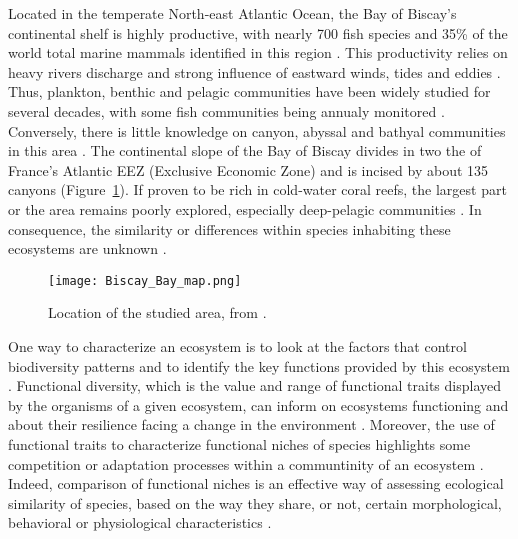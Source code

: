 Located in the temperate North-east Atlantic Ocean, the Bay of Biscay's continental shelf is highly productive, with nearly 700 fish species and 35\% of the world total marine mammals identified in this region \citep{borja2019}. This productivity relies on heavy rivers discharge and strong influence of eastward winds, tides and eddies \citep{borja2019,akpinar2020}. Thus, plankton, benthic and pelagic communities have been widely studied for several decades, with some fish communities being annualy monitored \citep{borja2019,doray2018}. Conversely, there is little knowledge on canyon, abyssal and bathyal communities in this area \citep{borja2019}. The continental slope of the Bay of Biscay divides in two the of France's Atlantic EEZ (Exclusive Economic Zone) and is incised by about 135 canyons \citep{bourillet2006,spitz2019,vandenbeld2017} (Figure~\ref{fig:bbm}). If proven to be rich in cold-water coral reefs, the largest part or the area remains poorly explored, especially deep-pelagic communities \citep{garcia2021,vandenbeld2017a,webb2010}. In consequence, the similarity or differences within species inhabiting these ecosystems are unknown \citep{kenchington2020}. 

\begin{figure} [!htbp]
	\begin{center}
		\texttt{[image: Biscay\_Bay\_map.png]}
	\end{center}
	\caption[Map of the studied area]{Location of the studied area, from \citep{bearez2017}.}
	\label{fig:bbm}
\end{figure}

One way to characterize an ecosystem is to look at the factors that control biodiversity patterns and to identify the key functions provided by this ecosystem \citep{aneeshkumar2017,brindamour2011,farre2016}. Functional diversity, which is the value and range of functional traits displayed by the organisms of a given ecosystem, can inform on ecosystems functioning and about their resilience facing a change in the environment \citep{dumay2004,martini2020}. Moreover, the use of functional traits to characterize functional niches of species highlights some competition or adaptation processes within a communtinity of an ecosystem \citep{aneeshkumar2017}. Indeed, comparison of functional niches is an effective way of assessing ecological similarity of species, based on the way they share, or not, certain morphological, behavioral or physiological characteristics \citep{aneeshkumar2017,farre2016,winemiller1991}.

